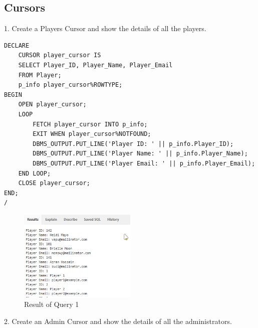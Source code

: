 \clearpage
\subsection{Cursors}
\hrulefill

1. Create a Players Cursor and show the details of all the players.

\begin{lstlisting}[caption={ Query 1},label={lst:q-1}]
    DECLARE
    CURSOR player_cursor IS
    SELECT Player_ID, Player_Name, Player_Email
    FROM Player;
    p_info player_cursor%ROWTYPE;
BEGIN
    OPEN player_cursor;
    LOOP
        FETCH player_cursor INTO p_info;
        EXIT WHEN player_cursor%NOTFOUND;
        DBMS_OUTPUT.PUT_LINE('Player ID: ' || p_info.Player_ID);
        DBMS_OUTPUT.PUT_LINE('Player Name: ' || p_info.Player_Name);
        DBMS_OUTPUT.PUT_LINE('Player Email: ' || p_info.Player_Email);
    END LOOP;
    CLOSE player_cursor;
END;
/

\end{lstlisting}

\begin{figure}[H]
    \centering
    \includegraphics[width=0.5\textwidth]{images/plsql/cursor/Player Cursor.png}
    \caption{Result of Query 1}
\end{figure}

2. Create an Admin Cursor and show the details of all the administrators.

